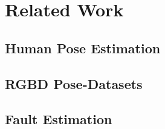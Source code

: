 \section{Related Work}
\label{sec:related_work}

\subsection{Human Pose Estimation}

\subsection{RGBD Pose-Datasets}

\subsection{Fault Estimation}
